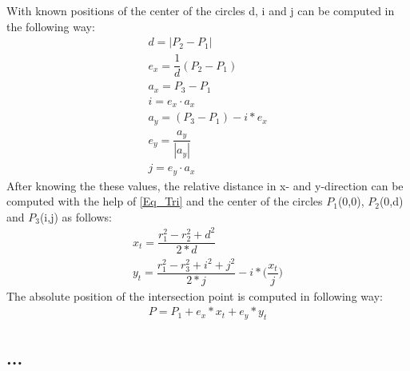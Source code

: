 With known positions of the center of the circles d, i and j can be computed in the following way\cite{Cotera.2016}:
\begin{align}
d = |P_2 - P_1| \\
e_x = \dfrac{1}{d}(P_2 - P_1) \\
a_x = P_3 - P_1 \\
i = e_x \cdot a_x \\
a_y = (P_3 - P_1) - i * e_x \\
e_y = \dfrac{a_y}{|a_y|} \\
j = e_y \cdot a_x
\end{align} 
After knowing the these values, the relative distance in x- and y-direction can be computed with the help of \ref{Eq_Tri} and the center of the circles $P_1$(0,0), $P_2$(0,d) and $P_3$(i,j) as follows:
\begin{align}
x_t = \dfrac{r_1^2 - r_2^2 + d^2}{2*d} \\
y_t = \dfrac{r_1^2 - r_3^2 + i^2 + j^2}{2*j} - i* \bigg(\dfrac{x_t}{j}\bigg) 
\end{align}
The absolute position of the intersection point is computed in following way:
\begin{align}
P = P_1 + e_x * x_t + e_y * y_t 
\end{align}

\subsection{...}